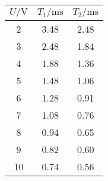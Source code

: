 \label{tab:oszillationen}
	\begin{tabular}{S[table-format=1.0]S[table-format=1.2]S[table-format=1.2]}
		\toprule
		{$U/\si{\volt}$} & {$T_1/\si{\milli\second}$} & {$T_2/\si{\milli\second}$}  \\
		 & 3.48 & 2.48 \\
		3 & 2.48 & 1.84 \\
		4 & 1.88 & 1.36 \\
		5 & 1.48 & 1.06 \\
		6 & 1.28 & 0.91 \\
		7 & 1.08 & 0.76 \\
		8 & 0.94 & 0.65 \\
		9 & 0.82 & 0.60 \\
		10 & 0.74 & 0.56 \\
		\bottomrule
	\end{tabular}
